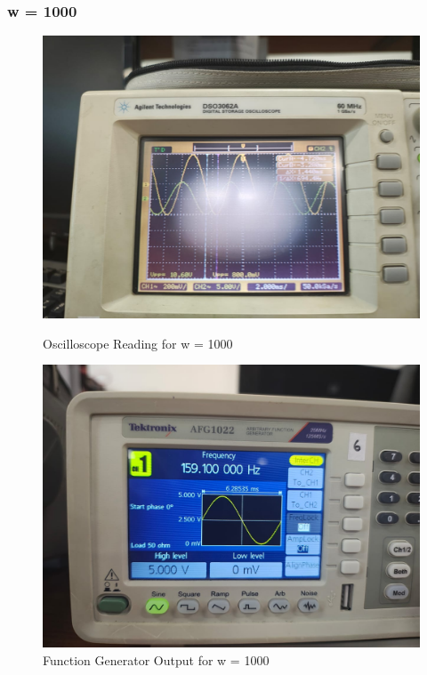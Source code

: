 \documentclass[a4paper,12pt]{article}
\begin{document}
\subsubsection{w = 1000}
\begin{figure}[H]
    \centering
    \begin{minipage}{0.48\textwidth}
        \centering
        \includegraphics[width=\textwidth]{fig/1w1000o.jpeg} %
        \caption{Oscilloscope Reading for w = 1000}
    \end{minipage}
    \hfill
    \begin{minipage}{0.48\textwidth}
        \centering
        \includegraphics[width=\textwidth]{fig/1w1000.jpeg} %
        \caption{Function Generator Output for w = 1000}
    \end{minipage}
\end{figure}
\end{document}
